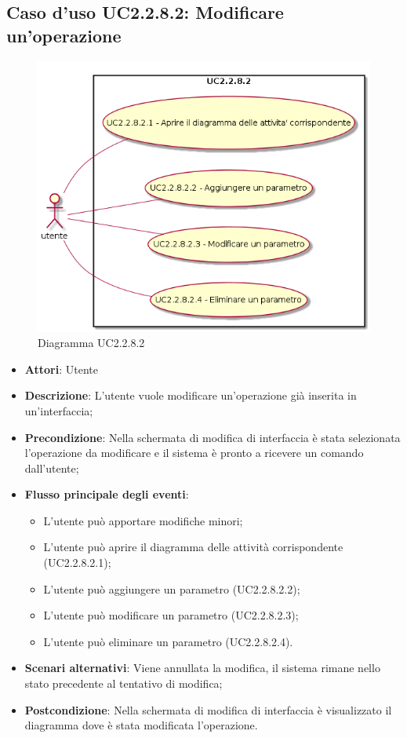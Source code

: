 \documentclass[../AnalisiDeiRequisiti.tex]{subfiles}
\begin{document}
			\subsection{Caso d'uso UC2.2.8.2: Modificare un'operazione}
			\begin{figure} [H]
				\centering
				\includegraphics[scale=0.45]{./Figures/UC2-2-8-2.png}
				\caption{Diagramma UC2.2.8.2}\label{}
			\end{figure}
			\begin{itemize}
				\item \textbf{Attori}: Utente
				\item \textbf{Descrizione}: L'utente vuole modificare un'operazione già inserita in un'interfaccia;
				\item \textbf{Precondizione}: Nella schermata di modifica di interfaccia è stata selezionata l'operazione da modificare e il sistema è pronto a ricevere un comando dall'utente;
				\item \textbf{Flusso principale degli eventi}: \begin{itemize}
					\item L'utente può apportare modifiche minori;
					\item L'utente può aprire il diagramma delle attività corrispondente (UC2.2.8.2.1);
					\item L'utente può aggiungere un parametro (UC2.2.8.2.2);
					\item L'utente può modificare un parametro (UC2.2.8.2.3);
					\item L'utente può eliminare un parametro (UC2.2.8.2.4).
				\end{itemize}
				\item \textbf{Scenari alternativi}: Viene annullata la modifica, il sistema rimane nello stato precedente al tentativo di modifica;
				\item \textbf{Postcondizione}: Nella schermata di modifica di interfaccia è visualizzato il diagramma dove è stata modificata l'operazione.
			\end{itemize}
\end{document}
